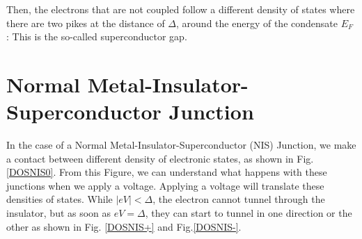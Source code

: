             Then, the electrons that are not coupled follow a different density of states where there are two pikes at the distance of $\Delta$, around the energy of the condensate $E_F$ : This is the so-called superconductor gap.
            
        \section[NIS Junction]{Normal Metal-Insulator-Superconductor Junction}
        
            In the case of a Normal Metal-Insulator-Superconductor (NIS) Junction, we make a contact between different density of electronic states, as shown in Fig. \ref{DOSNIS0}. From this Figure, we can understand what happens with these junctions when we apply a voltage. Applying a voltage will translate these densities of states. While $|eV|<\Delta$, the electron cannot tunnel through the insulator, but as soon as $eV=\Delta$, they can start to tunnel in one direction or the other as shown in Fig. \ref{DOSNIS+} and Fig.\ref{DOSNIS-}. 
        
